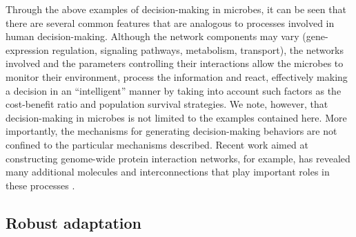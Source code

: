 Through the above examples of decision-making in microbes, it can be seen that there are several common features that are analogous to processes involved in human decision-making. Although the network components may vary (gene-expression regulation, signaling pathways, metabolism, transport), the networks involved and the parameters controlling their interactions allow the microbes to monitor their environment, process the information and react, effectively making a decision in an ``intelligent'' manner by taking into account such factors as the cost-benefit ratio and population survival strategies. We note, however, that decision-making in microbes is not limited to the examples contained here. More importantly, the mechanisms for generating decision-making behaviors are not confined to the particular mechanisms described. Recent work aimed at constructing genome-wide protein interaction networks, for example, has revealed many additional molecules and interconnections that play important roles in these processes \cite{noirot_protein_2004}.

\subsection{Robust adaptation}

